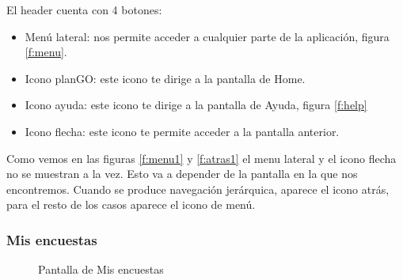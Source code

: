\documentclass[a4paper, 12pt]{book}
\begin{document}
El header cuenta con 4 botones:

\begin{itemize}
\item Men\'u lateral: nos permite acceder a cualquier parte de la aplicaci\'on, figura \ref{f:menu}.

\item Icono planGO: este icono te dirige a la pantalla de Home.
\item Icono ayuda: este icono te dirige a la pantalla de Ayuda, figura \ref{f:help}
\item Icono flecha: este icono te permite acceder a la pantalla anterior.
\end{itemize}

Como vemos en las figuras \ref{f:menu1} y \ref{f:atras1} el menu lateral y el icono flecha no se muestran a la vez.
Esto va a depender de la pantalla en la que nos encontremos. Cuando se produce navegaci\'on
jer\'arquica, aparece el icono atr\'as, para el resto de los casos aparece el icono de men\'u.



\subsubsection{Mis encuestas}
\label{sec:mis_encuestas}

\begin{figure}[H]
 \centering
  \caption{Pantalla de Mis encuestas}
 \label{f:mis_encuestas}
\end{figure}
\end{document}
